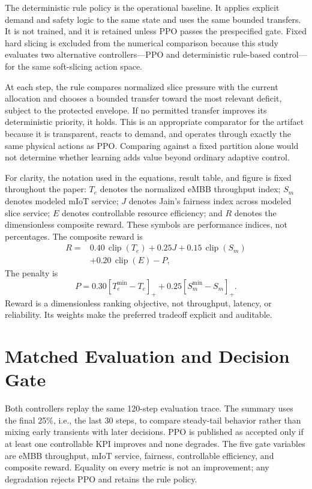 \documentclass[conference]{IEEEtran}
\begin{document}
The deterministic rule policy is the operational baseline. It applies explicit demand and safety logic to the same state and uses the same bounded transfers. It is not trained, and it is retained unless PPO passes the prespecified gate. Fixed hard slicing is excluded from the numerical comparison because this study evaluates two alternative controllers---PPO and deterministic rule-based control---for the same soft-slicing action space.

At each step, the rule compares normalized slice pressure with the current allocation and chooses a bounded transfer toward the most relevant deficit, subject to the protected envelope. If no permitted transfer improves its deterministic priority, it holds. This is an appropriate comparator for the artifact because it is transparent, reacts to demand, and operates through exactly the same physical actions as PPO. Comparing against a fixed partition alone would not determine whether learning adds value beyond ordinary adaptive control.

For clarity, the notation used in the equations, result table, and figure is fixed throughout the paper: $T_e$ denotes the normalized eMBB throughput index; $S_m$ denotes modeled mIoT service; $J$ denotes Jain's fairness index across modeled slice service; $E$ denotes controllable resource efficiency; and $R$ denotes the dimensionless composite reward. These symbols are performance indices, not percentages. The composite reward is
\begin{align}
R={}&0.40\,\operatorname{clip}(T_e)+0.25J
+0.15\,\operatorname{clip}(S_m) \nonumber\\
&+0.20\,\operatorname{clip}(E)-P, \label{eq:reward}
\end{align}
The penalty is
\begin{equation}
P=0.30[T_e^{\min}-T_e]_++0.25[S_m^{\min}-S_m]_+.
\end{equation}
Reward is a dimensionless ranking objective, not throughput, latency, or reliability. Its weights make the preferred tradeoff explicit and auditable.

\section{Matched Evaluation and Decision Gate}
Both controllers replay the same 120-step evaluation trace. The summary uses the final 25\%, i.e., the last 30 steps, to compare steady-tail behavior rather than mixing early transients with later decisions. PPO is published as accepted only if at least one controllable KPI improves and none degrades. The five gate variables are eMBB throughput, mIoT service, fairness, controllable efficiency, and composite reward. Equality on every metric is not an improvement; any degradation rejects PPO and retains the rule policy.
\end{document}
